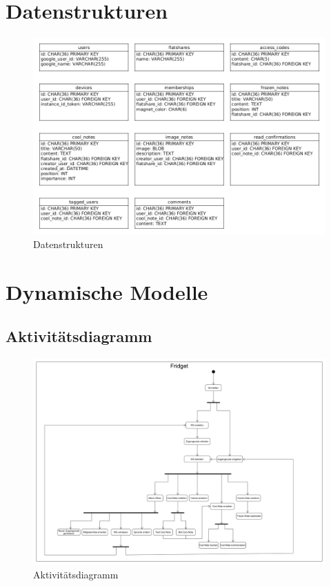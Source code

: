 \documentclass[a4paper]{scrreprt}
\begin{document}
\chapter{Datenstrukturen}
		 \begin{figure}[H]
	       \centering
	       \includegraphics[scale = .50]{datenstruktur.png}
	       \caption{Datenstrukturen}
	      \end{figure}
				
\chapter{Dynamische Modelle}
	\section{Aktivitätsdiagramm}
\begin{figure}[H]
	       \centering
	       \includegraphics[scale=0.25]{aktitivitaetsdiagramm.png}
	       \caption{Aktivitätsdiagramm}
	      \end{figure}
	
	
\end{document}
